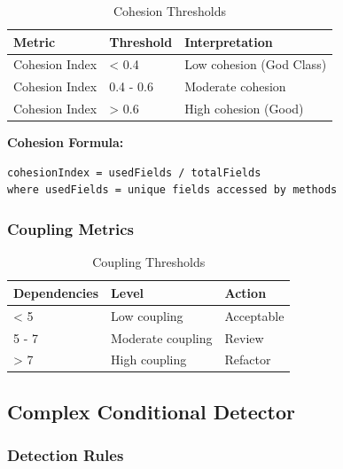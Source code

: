 \documentclass[12pt,a4paper]{article}
\begin{document}
    \begin{table}[H]
        \caption{Cohesion Thresholds}
        \begin{tabular}{|l|l|l|}
            \hline
            \textbf{Metric} & \textbf{Threshold} & \textbf{Interpretation} \\
            \hline
            Cohesion Index & < 0.4 & Low cohesion (God Class) \\
            \hline
            Cohesion Index & 0.4 - 0.6 & Moderate cohesion \\
            \hline
            Cohesion Index & > 0.6 & High cohesion (Good) \\
            \hline
        \end{tabular}
    \end{table}

    \textbf{Cohesion Formula:}
    \begin{verbatim}
cohesionIndex = usedFields / totalFields
where usedFields = unique fields accessed by methods
    \end{verbatim}

    \subsubsection{Coupling Metrics}

    \begin{table}[H]
        \caption{Coupling Thresholds}
        \begin{tabular}{|l|l|l|}
            \hline
            \textbf{Dependencies} & \textbf{Level} & \textbf{Action} \\
            \hline
            < 5 & Low coupling & Acceptable \\
            \hline
            5 - 7 & Moderate coupling & Review \\
            \hline
            > 7 & High coupling & Refactor \\
            \hline
        \end{tabular}
    \end{table}

    \subsection{Complex Conditional Detector}

    \subsubsection{Detection Rules}
\end{document}

